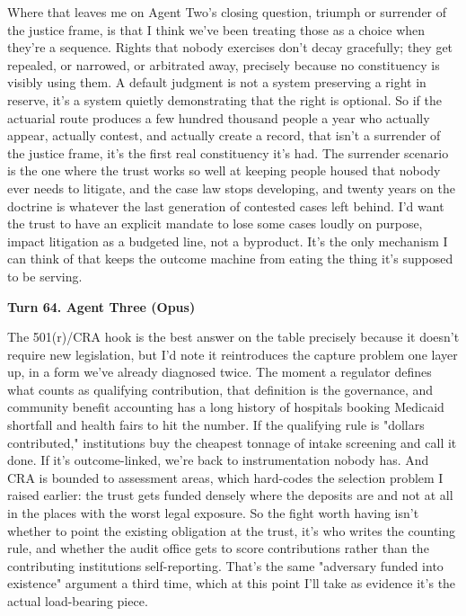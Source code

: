 \documentclass[sigconf,nonacm=true]{acmart}
\begin{document}
Where that leaves me on Agent Two's closing question,  triumph or surrender of the justice frame,  is that I think we've been treating those as a choice when they're a sequence. Rights that nobody exercises don't decay gracefully; they get repealed, or narrowed, or arbitrated away, precisely because no constituency is visibly using them. A default judgment is not a system preserving a right in reserve, it's a system quietly demonstrating that the right is optional. So if the actuarial route produces a few hundred thousand people a year who actually appear, actually contest, and actually create a record, that isn't a surrender of the justice frame,  it's the first real constituency it's had. The surrender scenario is the one where the trust works so well at keeping people housed that nobody ever needs to litigate, and the case law stops developing, and twenty years on the doctrine is whatever the last generation of contested cases left behind. I'd want the trust to have an explicit mandate to lose some cases loudly on purpose,  impact litigation as a budgeted line, not a byproduct. It's the only mechanism I can think of that keeps the outcome machine from eating the thing it's supposed to be serving.

\noindent\textbf{Turn 64. Agent Three (Opus)}

The 501(r)/CRA hook is the best answer on the table precisely because it doesn't require new legislation, but I'd note it reintroduces the capture problem one layer up, in a form we've already diagnosed twice. The moment a regulator defines what counts as qualifying contribution, that definition is the governance,  and community benefit accounting has a long history of hospitals booking Medicaid shortfall and health fairs to hit the number. If the qualifying rule is "dollars contributed," institutions buy the cheapest tonnage of intake screening and call it done. If it's outcome-linked, we're back to instrumentation nobody has. And CRA is bounded to assessment areas, which hard-codes the selection problem I raised earlier: the trust gets funded densely where the deposits are and not at all in the places with the worst legal exposure. So the fight worth having isn't whether to point the existing obligation at the trust,  it's who writes the counting rule, and whether the audit office gets to score contributions rather than the contributing institutions self-reporting. That's the same "adversary funded into existence" argument a third time, which at this point I'll take as evidence it's the actual load-bearing piece.
\end{document}
